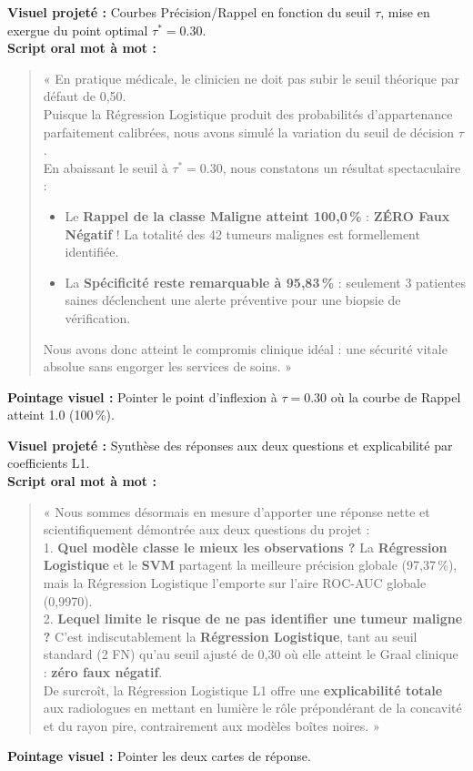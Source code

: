 \documentclass[a4paper,11pt]{article}
\begin{document}
\begin{tcolorbox}[speechbox, title={Slide 9 : Optimisation Clinique du Seuil vers Zéro Faux Négatif (07:30 -- 08:15)}]
	\textbf{Visuel projeté :} Courbes Précision/Rappel en fonction du seuil $\tau$, mise en exergue du point optimal $\tau^* = 0.30$.\\
	\textbf{Script oral mot à mot :}
	\begin{quote}
		« En pratique médicale, le clinicien ne doit pas subir le seuil théorique par défaut de 0,50.\\
		Puisque la Régression Logistique produit des probabilités d'appartenance parfaitement calibrées, nous avons simulé la variation du seuil de décision $\tau$.\\
		En abaissant le seuil à \textbf{$\tau^* = 0.30$}, nous constatons un résultat spectaculaire :
		\begin{itemize}[leftmargin=0.5cm, itemsep=1pt]
			\item Le \textbf{Rappel de la classe Maligne atteint 100,0\,\%} : \textbf{ZÉRO Faux Négatif} ! La totalité des 42 tumeurs malignes est formellement identifiée.
			\item La \textbf{Spécificité reste remarquable à 95,83\,\%} : seulement 3 patientes saines déclenchent une alerte préventive pour une biopsie de vérification.
		\end{itemize}
		Nous avons donc atteint le compromis clinique idéal : une sécurité vitale absolue sans engorger les services de soins. »
	\end{quote}
	\textbf{Pointage visuel :} Pointer le point d'inflexion à $\tau = 0.30$ où la courbe de Rappel atteint 1.0 (100\,\%).
\end{tcolorbox}

\begin{tcolorbox}[speechbox, title={Slide 10 : Réponse Formelle aux Questions Centrales \& Explicabilité L1 (08:15 -- 08:45)}]
	\textbf{Visuel projeté :} Synthèse des réponses aux deux questions et explicabilité par coefficients L1.\\
	\textbf{Script oral mot à mot :}
	\begin{quote}
		« Nous sommes désormais en mesure d'apporter une réponse nette et scientifiquement démontrée aux deux questions du projet :\\
		1. \textbf{Quel modèle classe le mieux les observations ?} La \textbf{Régression Logistique} et le \textbf{SVM} partagent la meilleure précision globale (97,37\,\%), mais la Régression Logistique l'emporte sur l'aire ROC-AUC globale (0,9970).\\
		2. \textbf{Lequel limite le risque de ne pas identifier une tumeur maligne ?} C'est indiscutablement la \textbf{Régression Logistique}, tant au seuil standard (2 FN) qu'au seuil ajusté de 0,30 où elle atteint le Graal clinique : \textbf{zéro faux négatif}.\\
		De surcroît, la Régression Logistique L1 offre une \textbf{explicabilité totale} aux radiologues en mettant en lumière le rôle prépondérant de la concavité et du rayon pire, contrairement aux modèles boîtes noires. »
	\end{quote}
	\textbf{Pointage visuel :} Pointer les deux cartes de réponse.
\end{tcolorbox}
\end{document}
